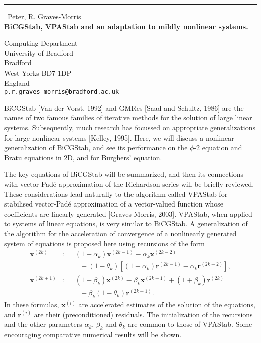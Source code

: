 \documentclass{report}
\begin{document}
\begin{center}
\rule{6in}{1pt} \
{\large Peter, R. Graves-Morris \\
{\bf BiCGStab, VPAStab and an adaptation to mildly nonlinear systems.}}

Computing Department \\ University of Bradford \\ Bradford \\ West Yorks BD7 1DP \\ England
\\
{\tt p.r.graves-morris@bradford.ac.uk}\end{center}


BiCGStab [Van der Vorst, 1992] and GMRes [Saad and Schultz, 1986] are the
names of two famous families of iterative methods
for the solution of large linear systems. Subsequently, much research has focussed on
appropriate generalizations for large nonlinear systems [Kelley, 1995].
Here, we will discuss a
nonlinear generalization of BiCGStab, and see its performance on the $\phi$-2 equation
and Bratu equations in 2D, and for Burghers' equation.

The key equations of BiCGStab will be summarized, and then its connections with
vector Pad\'{e} approximation of the Richardson series will be briefly reviewed.
These considerations lead naturally to the algorithm called VPAStab for
stabilised vector-Pad\'{e} approximation of a vector-valued function
whose coefficients are linearly generated [Graves-Morris, 2003].
VPAStab, when applied to systems of linear equations, is very similar to BiCGStab.
A generalization of the algorithm for the acceleration of convergence of a
nonlinearly generated system of equations is proposed here using recursions of the form
\begin{eqnarray}
\mathbf{x}^{(2k)} & := &
(1+\alpha_{k})\mathbf{x}^{(2k-1)}-\alpha_{k}\mathbf{x}^{(2k-2)} \nonumber
\\
& & \ \ \
+(1-\theta_{k})[(1+\alpha_{k})\mathbf{r}^{(2k-1)}-\alpha_{k}\mathbf{r}^{(2k-2)}],
\nonumber \\
\mathbf{x}^{(2k+1)} & := & (1+\beta_{k})\mathbf{x}^{(2k)} -
\beta_{k}\mathbf{x}^{(2k-1)} + (1+\beta_{k})\mathbf{r}^{(2k)} \nonumber
\\
& & \ \ \ - \beta_{k}(1-\theta_{k})\mathbf{r}^{(2k-1)}. \nonumber
\end{eqnarray}
In these formulas, $\mathbf{x}^{(i)}$ are accelerated estimates of the
solution of the equations,
and $\mathbf{r}^{(i)}$ are their (preconditioned) residuals. The
initialization of the recursions
and the other parameters $\alpha_{k}$, $\beta_{k}$ and $\theta_{k}$
are common to those of VPAStab. Some encouraging comparative numerical
results will be shown.
\end{document}
